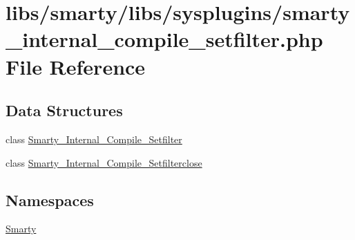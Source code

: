 \hypertarget{smarty__internal__compile__setfilter_8php}{}\section{libs/smarty/libs/sysplugins/smarty\+\_\+internal\+\_\+compile\+\_\+setfilter.php File Reference}
\label{smarty__internal__compile__setfilter_8php}
\subsection*{Data Structures}
\begin{DoxyCompactItemize}
\item 
class \hyperlink{class_smarty___internal___compile___setfilter}{Smarty\+\_\+\+Internal\+\_\+\+Compile\+\_\+\+Setfilter}
\item 
class \hyperlink{class_smarty___internal___compile___setfilterclose}{Smarty\+\_\+\+Internal\+\_\+\+Compile\+\_\+\+Setfilterclose}
\end{DoxyCompactItemize}
\subsection*{Namespaces}
\begin{DoxyCompactItemize}
\item 
 \hyperlink{namespace_smarty}{Smarty}
\end{DoxyCompactItemize}
